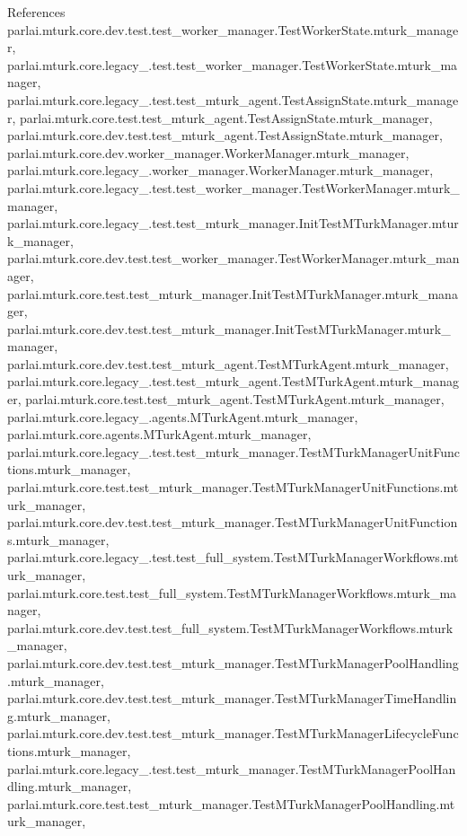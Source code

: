 References parlai.\+mturk.\+core.\+dev.\+test.\+test\+\_\+worker\+\_\+manager.\+Test\+Worker\+State.\+mturk\+\_\+manager, parlai.\+mturk.\+core.\+legacy\+\_.\+test.\+test\+\_\+worker\+\_\+manager.\+Test\+Worker\+State.\+mturk\+\_\+manager, parlai.\+mturk.\+core.\+legacy\+\_.\+test.\+test\+\_\+mturk\+\_\+agent.\+Test\+Assign\+State.\+mturk\+\_\+manager, parlai.\+mturk.\+core.\+test.\+test\+\_\+mturk\+\_\+agent.\+Test\+Assign\+State.\+mturk\+\_\+manager, parlai.\+mturk.\+core.\+dev.\+test.\+test\+\_\+mturk\+\_\+agent.\+Test\+Assign\+State.\+mturk\+\_\+manager, parlai.\+mturk.\+core.\+dev.\+worker\+\_\+manager.\+Worker\+Manager.\+mturk\+\_\+manager, parlai.\+mturk.\+core.\+legacy\+\_.\+worker\+\_\+manager.\+Worker\+Manager.\+mturk\+\_\+manager, parlai.\+mturk.\+core.\+legacy\+\_.\+test.\+test\+\_\+worker\+\_\+manager.\+Test\+Worker\+Manager.\+mturk\+\_\+manager, parlai.\+mturk.\+core.\+legacy\+\_.\+test.\+test\+\_\+mturk\+\_\+manager.\+Init\+Test\+M\+Turk\+Manager.\+mturk\+\_\+manager, parlai.\+mturk.\+core.\+dev.\+test.\+test\+\_\+worker\+\_\+manager.\+Test\+Worker\+Manager.\+mturk\+\_\+manager, parlai.\+mturk.\+core.\+test.\+test\+\_\+mturk\+\_\+manager.\+Init\+Test\+M\+Turk\+Manager.\+mturk\+\_\+manager, parlai.\+mturk.\+core.\+dev.\+test.\+test\+\_\+mturk\+\_\+manager.\+Init\+Test\+M\+Turk\+Manager.\+mturk\+\_\+manager, parlai.\+mturk.\+core.\+dev.\+test.\+test\+\_\+mturk\+\_\+agent.\+Test\+M\+Turk\+Agent.\+mturk\+\_\+manager, parlai.\+mturk.\+core.\+legacy\+\_.\+test.\+test\+\_\+mturk\+\_\+agent.\+Test\+M\+Turk\+Agent.\+mturk\+\_\+manager, parlai.\+mturk.\+core.\+test.\+test\+\_\+mturk\+\_\+agent.\+Test\+M\+Turk\+Agent.\+mturk\+\_\+manager, parlai.\+mturk.\+core.\+legacy\+\_.\+agents.\+M\+Turk\+Agent.\+mturk\+\_\+manager, parlai.\+mturk.\+core.\+agents.\+M\+Turk\+Agent.\+mturk\+\_\+manager, parlai.\+mturk.\+core.\+legacy\+\_.\+test.\+test\+\_\+mturk\+\_\+manager.\+Test\+M\+Turk\+Manager\+Unit\+Functions.\+mturk\+\_\+manager, parlai.\+mturk.\+core.\+test.\+test\+\_\+mturk\+\_\+manager.\+Test\+M\+Turk\+Manager\+Unit\+Functions.\+mturk\+\_\+manager, parlai.\+mturk.\+core.\+dev.\+test.\+test\+\_\+mturk\+\_\+manager.\+Test\+M\+Turk\+Manager\+Unit\+Functions.\+mturk\+\_\+manager, parlai.\+mturk.\+core.\+legacy\+\_.\+test.\+test\+\_\+full\+\_\+system.\+Test\+M\+Turk\+Manager\+Workflows.\+mturk\+\_\+manager, parlai.\+mturk.\+core.\+test.\+test\+\_\+full\+\_\+system.\+Test\+M\+Turk\+Manager\+Workflows.\+mturk\+\_\+manager, parlai.\+mturk.\+core.\+dev.\+test.\+test\+\_\+full\+\_\+system.\+Test\+M\+Turk\+Manager\+Workflows.\+mturk\+\_\+manager, parlai.\+mturk.\+core.\+dev.\+test.\+test\+\_\+mturk\+\_\+manager.\+Test\+M\+Turk\+Manager\+Pool\+Handling.\+mturk\+\_\+manager, parlai.\+mturk.\+core.\+dev.\+test.\+test\+\_\+mturk\+\_\+manager.\+Test\+M\+Turk\+Manager\+Time\+Handling.\+mturk\+\_\+manager, parlai.\+mturk.\+core.\+dev.\+test.\+test\+\_\+mturk\+\_\+manager.\+Test\+M\+Turk\+Manager\+Lifecycle\+Functions.\+mturk\+\_\+manager, parlai.\+mturk.\+core.\+legacy\+\_.\+test.\+test\+\_\+mturk\+\_\+manager.\+Test\+M\+Turk\+Manager\+Pool\+Handling.\+mturk\+\_\+manager, parlai.\+mturk.\+core.\+test.\+test\+\_\+mturk\+\_\+manager.\+Test\+M\+Turk\+Manager\+Pool\+Handling.\+mturk\+\_\+manager, 